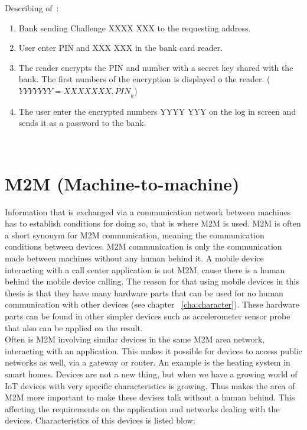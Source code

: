 Describing of~:
\begin{enumerate}
	\item Bank sending Challenge XXXX XXX to the requesting address.
	\item User enter PIN and XXX XXX in the bank card reader.
	\item The reader encrypts the PIN and number with a secret key shared with the bank. The first numbers of the encryption is displayed o the reader. ($YYYY YYY = {XXXX XXX, PIN}_k$) 
	\item The user enter the encrypted numbers YYYY YYY on the log in screen and sends it as a password to the bank.
\end{enumerate}
~\cite[ch.3]{rosssec}

\section{M2M (Machine-to-machine)}\label{sec:m2mauth}
Information that is exchanged via a communication network between machines has to establish conditions for doing so, that is where M2M is used. M2M is often a short synonym for M2M communication, meaning the communication conditions between devices. M2M communication is only the communication made between machines without any human behind it. A mobile device interacting with a call center application is not M2M, cause there is a human behind the mobile device calling. The reason for that using mobile devices in this thesis is that they have many hardware parts that can be used for no human communication with other devices (see chapter ~\ref{cha:character}). These hardware parts can be found in other simpler devices such as accelerometer sensor probe that also can be applied on the result.
\\
Often is M2M involving similar devices  in the same M2M area network, interacting with an application. This makes it possible for devices to access public networks as well, via a gateway or router. An example is the heating system in smart homes. 
Devices are not a new thing, but when we have a growing world of IoT devices with very specific characteristics is growing. Thus makes the area of M2M more important to make these devises talk without a human behind. This affecting the requirements on the application and networks dealing with the devices. Characteristics of this devices is listed blow;
